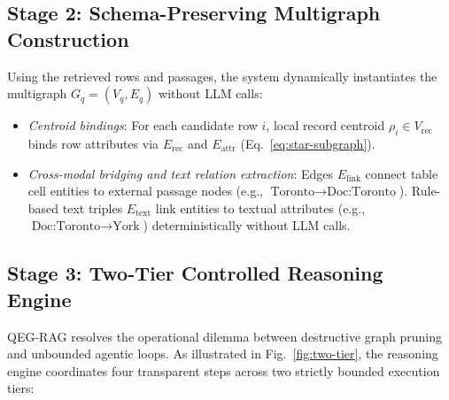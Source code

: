 \documentclass[runningheads]{llncs}
\begin{document}
\subsection{Stage 2: Schema-Preserving Multigraph Construction}
\label{sec:method-kg}
Using the retrieved rows and passages, the system dynamically instantiates the multigraph $G_q=(V_q, E_q)$ without LLM calls:
\begin{itemize}[leftmargin=1.5em]
    \item \emph{Centroid bindings}: For each candidate row $i$, local record centroid $\rho_i \in V_{\text{rec}}$ binds row attributes via $E_{\text{rec}}$ and $E_{\text{attr}}$ (Eq.~\ref{eq:star-subgraph}).
    \item \emph{Cross-modal bridging and text relation extraction}: Edges $E_{\text{link}}$ connect table cell entities to external passage nodes (e.g., $\text{Toronto} \to \text{Doc:Toronto}$). Rule-based text triples $E_{\text{text}}$ link entities to textual attributes (e.g., $\text{Doc:Toronto} \to \text{York}$) deterministically without LLM calls.
\end{itemize}

\subsection{Stage 3: Two-Tier Controlled Reasoning Engine}
\label{sec:method-engine}



QEG-RAG resolves the operational dilemma between destructive graph pruning and unbounded agentic loops. As illustrated in Fig.~\ref{fig:two-tier}, the reasoning engine coordinates four transparent steps across two strictly bounded execution tiers:
\end{document}
